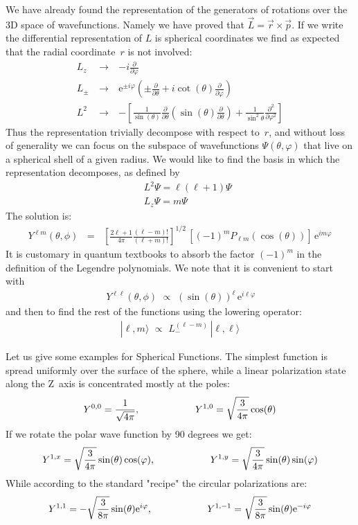 \documentclass[onecolumn,fleqn]{revtex4}
\newcommand{\eexp}{\mathrm{e}^}
\newcommand{\beq}{\begin{eqnarray}}
\newcommand{\eeq}{\end{eqnarray}}
\begin{document}
We have already found the  
representation of the generators 
of rotations over the 3D space 
of wavefunctions. 
Namely we have proved that $\vec{L}=\vec{r}\times \vec{p}$. 
If we write the differential 
representation of $L$ is spherical 
coordinates we find as expected that 
the radial coordinate~$r$ is not involved: 
\beq
 L_z & \ \rightarrow \ & - i \frac{\partial}{\partial \varphi }
\\ 
 L_\pm  & \ \rightarrow \ &  \eexp{\pm i \varphi} \left(\pm \frac {\partial} { \partial \theta} 
+ i \cot (\theta)\frac{\partial}{\partial \varphi}\right)
\\ 
L^2 & \ \rightarrow \ & - \left[\frac{1}{\sin (\theta)} 
\frac{\partial}{\partial \theta} (\sin (\theta) \frac{\partial}{\partial \theta}) 
+ \frac {1}{\sin^2 \theta} \frac{\partial^2}{\partial \varphi ^2}\right] 
\eeq
Thus the representation trivially 
decompose with respect to~$r$, 
and without loss of generality 
we can focus on the subspace of 
wavefunctions ${\Psi(\theta,\varphi)}$  
that live on a spherical shell of a given radius. 
We would like to find the basis 
in which the representation decomposes,    
as defined by 
\beq
&& L^2\Psi = \ell(\ell+1)\Psi
\\ 
&& L_z\Psi = m\Psi
\eeq
The solution is:
\beq
Y^{\ell m}(\theta , \phi) \,\ \ = \ \ \, 
\left[ \frac{2\ell+1}{4\pi} \frac{(\ell-m)!}{(\ell+m)!} \right]^{1/2} \, 
\left[ (-1)^m P_{\ell m}(\cos(\theta))\right] \, \eexp{im\varphi } 
\eeq
It is customary in quantum textbooks to absorb 
the factor ${(-1)^m}$ in the definition of the Legendre polynomials. 
We note that it is convenient to start with 
\beq
\, Y^{\ell \ell}(\theta , \phi) 
\,\, \propto \,\, 
(\sin(\theta))^{\ell} \, \eexp{i \ell \varphi } 
\eeq
and then to find the rest of the functions using the lowering operator:
\beq
| \ell,m \rangle 
\,\, \propto \,\, 
L_{-}^{(\ell-m)} 
\, |\ell,\ell\rangle 
\eeq


Let us give some examples for Spherical Functions. 
The simplest function is spread uniformly 
over the surface of the sphere, 
while a linear polarization state along the Z~axis 
is concentrated mostly at the poles:
\beq
Y^{0,0} = \frac{1}{\sqrt{4\pi}}, 
\hspace*{2cm}
Y^{1,0} = \sqrt{\frac{3}{4\pi}} \cos(\theta) 
\eeq
If we rotate the polar wave function by 90 degrees we get:
\beq
Y^{1,x} = \sqrt{\frac{3}{4\pi}} \sin(\theta)\cos(\varphi), 
\hspace*{2cm}
Y^{1,y} = \sqrt{\frac{3}{4\pi}} \sin(\theta)\sin(\varphi) 
\eeq
While according to the standard "recipe" the circular polarizations are:
\beq
Y^{1,1} = -\sqrt{\frac{3}{8\pi}} \sin(\theta) \eexp{i \varphi},
\hspace*{2cm}
Y^{1,-1} = \sqrt{\frac{3}{8\pi}} \sin(\theta) \eexp{-i \varphi} 
\eeq
\end{document}
